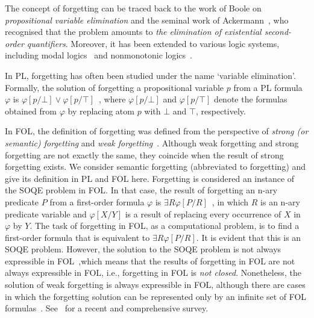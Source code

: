 \documentclass[runningheads]{llncs}
\begin{document}
The concept of forgetting can be traced back to the work of Boole on \emph{propositional
	variable elimination} and the seminal work of Ackermann~\cite{ackermann1935untersuchungen}, who recognised that the problem amounts to \emph{the elimination of existential second-order quantifiers}.
Moreover, it has been extended  to various logic systems, including modal logics~\cite{Yan:AIJ:2009,fang2019forgetting} and nonmonotonic logics~\cite{DBLP:journals/jair/WangZZZ14,gonccalves2020limits}.



In PL, forgetting has often been studied under the name `variable
elimination'. Formally, the solution of forgetting a propositional variable $p$ from a PL formula $\varphi$ is $\varphi[p/\bot] \vee \varphi[p/\top]$~\cite{lin1994forget}, where $\varphi[p/\bot]$ and $\varphi[p/\top]$ denote the formulas obtained from $\varphi$ by replacing atom $p$ with $\bot$ and $\top$, respectively.


In FOL, the definition of forgetting was defined from the perspective of \emph{strong (or semantic) forgetting} and \emph{weak forgetting}~\cite{Zhang:KR:2010}.
Although  weak forgetting and strong forgetting are not exactly the same, they coincide when the result of strong forgetting exists.
We consider semantic forgetting (abbreviated to forgetting) and give its definition in PL and FOL here.
Forgetting is considered an instance of the SOQE problem in FOL. In that case, the result of forgetting an n-ary predicate $P$ from a first-order formula $\varphi$ is $\exists R \varphi[P/R]$~\cite{lin1994forget}, in which $R$ is an n-ary predicate variable and $\varphi[X/Y]$ is a result of replacing every occurrence of $X$ in $\varphi$ by $Y$. The task of forgetting in FOL, as a computational problem, is to find a first-order formula that is equivalent to $\exists R \varphi[P/R]$. It is evident that this is an SOQE problem. However, the solution to the SOQE problem is not always expressible in FOL~\cite{gabbay2008second},which means that the results of forgetting in FOL are not always expressible in FOL, i.e., forgetting in FOL is \emph{not closed}.
Nonetheless, the solution of weak forgetting is always expressible in FOL, although
there are cases in which the forgetting solution can be represented only by an infinite set of
FOL formulas~\cite{Zhang:KR:2010}. %
See~\cite{eiter2019brief} for a recent and comprehensive survey.
\end{document}
